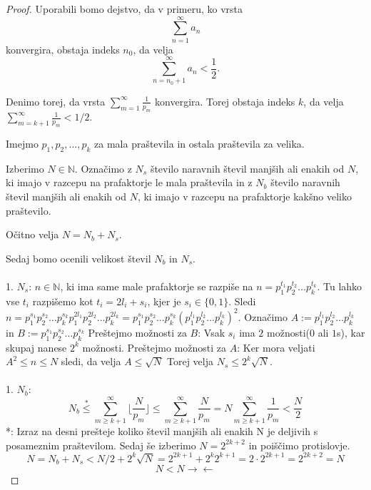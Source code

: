 \documentclass{amsart}
\newcommand{\NN}{\mathbb{N}}
\begin{document}
\begin{proof}
    Uporabili bomo dejstvo, da v primeru, ko vrsta \[\sum_{n=1}^{\infty}a_n\] konvergira, obstaja indeks \(n_0\), da velja
    \[\sum_{n=n_0 +1 }^{\infty}a_n < \frac{1}{2}.\]

    Denimo torej, da vrsta \(\sum_{m = 1}^{\infty} \frac{1}{p_m}\) konvergira. Torej obstaja indeks \(k\), da velja 
    \(\sum_{m=k+1 }^{\infty} \frac{1}{p_m} < 1/2.\)
    
    Imejmo \(p_1, p_2, \ldots, p_k\) za mala praštevila in ostala praštevila za velika.

    Izberimo \(N \in \NN.\) Označimo z \(N_s\) število naravnih števil manjših ali enakih od \(N\), ki imajo v razcepu na prafaktorje le mala praštevila in 
    z \(N_b\) število naravnih števil manjših ali enakih od \(N\), ki imajo v razcepu na prafaktorje kakšno veliko praštevilo.

    Očitno velja \(N = N_b + N_s\).

    Sedaj bomo ocenili velikost števil \(N_b\) in \(N_s\).\\
    \\
    1. \(N_s\): \newline
    \(n \in \NN\), ki ima same male prafaktorje se razpiše na \(n = p_1^{t_1} p_2^{t_2} \ldots p_k^{t_k}.\)
    Tu lahko vse \(t_i\) razpišemo kot \(t_i = 2l_i + s_i\), kjer je \(s_i \in \{0,1\}\). Sledi\newline \(n = p_1^{s_1} p_2^{s_2}  \ldots p_k^{s_k} p_1^{2l_1} p_2^{2l_2} \ldots p_k^{2l_k} =p_1^{s_1} p_2^{s_2}  \ldots 
    p_k^{s_k} \left(p_1^{l_1} p_2^{l_2} \ldots p_k^{l_k}\right)^2 .\) Označimo \newline 
    \(A := p_1^{l_1} p_2^{l_2} \ldots p_k^{l_k}\) in \(B := p_1^{s_1} p_2^{s_2} \ldots p_k^{s_k}\)
    \newline Preštejmo možnosti za \(B\): Vsak \(s_i\) ima \(2\) možnosti($0$ ali $1$s), kar skupaj nanese \(2^k\) možnosti.
    \newline Preštejmo možnosti za \(A\): Ker mora veljati \(A^2 \leq n \leq N\) sledi, da velja \(A \leq \sqrt{N}\)
    \newline Torej velja \(N_s \leq 2^k\sqrt{N}.\)\\
    \\
    1. \(N_b\): \newline
    \[N_b \stackrel{*}{\leq} \sum_{m \geq k+1}^{\infty} \lfloor \frac{N}{p_m} \rfloor \leq \sum_{m \geq k+1}^{\infty} \frac{N}{p_m} = 
    N \sum_{m \geq k+1}^{\infty} \frac{1}{p_m} < \frac{N}{2}\]
    *: Izraz na desni prešteje koliko števil manjših ali enakih N je deljivih s posameznim praštevilom.
    \newline Sedaj še izberimo \(N = 2^{2k+2}\) in poiščimo protislovje.
    \[N = N_b+N_s <N/2+2^k\sqrt{N} = 2^{2k+1}+2^k2^{k+1} =2\cdot2^{2k+1}= 2^{2k+2} = N\]
    \[N<N \rightarrow\leftarrow\]
\end{proof}
\end{document}
